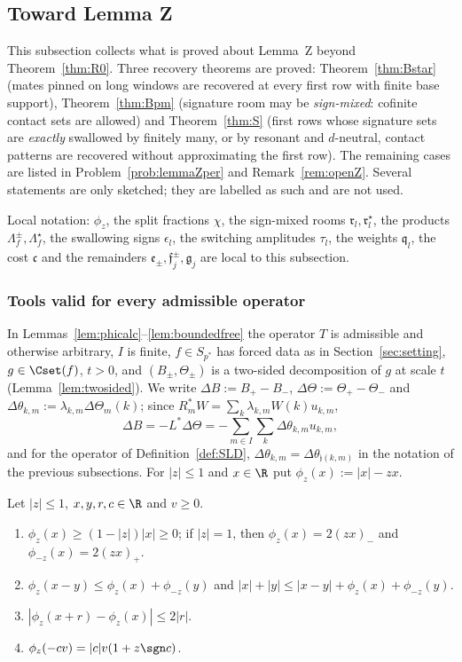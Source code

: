 
\subsection{Toward Lemma Z}\label{subsec:towardZ}
This subsection collects what is proved about Lemma~Z beyond
Theorem~\ref{thm:R0}.  Three recovery theorems are proved:
Theorem~\ref{thm:Bstar} (mates pinned on long windows are recovered at
every first row with finite base support),
Theorem~\ref{thm:Bpm} (signature room may be \emph{sign-mixed}: cofinite
contact sets are allowed) and Theorem~\ref{thm:S} (first rows whose
signature sets are \emph{exactly} swallowed by finitely many, or by
resonant and $d$-neutral, contact patterns are recovered without
approximating the first row).  The remaining cases are listed in
Problem~\ref{prob:lemmaZper} and Remark~\ref{rem:openZ}.  Several statements
are only sketched; they are labelled as such and are not used.

Local notation: $\phi_z$, the split fractions $\chi$, the sign-mixed rooms
$\mathfrak r_l,\mathfrak r^\star_l$, the products $\Lambda^\pm_f,
\Lambda^\star_f$, the swallowing signs $\epsilon_l$, the switching
amplitudes $\tau_l$, the weights $\mathfrak q_l$, the cost $\mathfrak c$
and the remainders $\mathfrak e_\pm,\mathfrak f^\pm_j,\mathfrak g_j$ are
local to this subsection.

\subsubsection*{Tools valid for every admissible operator}
In Lemmas~\ref{lem:phicalc}--\ref{lem:boundedfree} the operator $T$ is
admissible and otherwise arbitrary, $I$ is finite, $f\in S_{p^*}$ has
forced data as in Section~\ref{sec:setting}, $g\in\Cset(f)$, $t>0$, and
$(B_\pm,\Theta_\pm)$ is a two-sided decomposition of $g$ at scale $t$
(Lemma~\ref{lem:twosided}).  We write $\Delta B:=B_+-B_-$,
$\Delta\Theta:=\Theta_+-\Theta_-$ and
$\Delta\theta_{k,m}:=\lambda_{k,m}\Delta\Theta_m(k)$; since
$R_m^*W=\sum_k\lambda_{k,m}W(k)u_{k,m}$,
\begin{equation}\label{eq:DeltaB}
 \Delta B=-L^*\Delta\Theta=-\sum_{m\in I}\sum_k\Delta\theta_{k,m}u_{k,m},
\end{equation}
and for the operator of Definition~\ref{def:SLD}, $\Delta\theta_{k,m}=
\Delta\theta_{\mathfrak j(k,m)}$ in the notation of the previous subsections.
For $|z|\le1$ and $x\in\R$ put $\phi_z(x):=|x|-zx$.

\begin{lemma}\label{lem:phicalc}
Let $|z|\le1$, $x,y,r,c\in\R$ and $v\ge0$.
\begin{enumerate}
\item[(a)] $\phi_z(x)\ge(1-|z|)|x|\ge0$; if $|z|=1$, then $\phi_z(x)=2(zx)_-$
and $\phi_{-z}(x)=2(zx)_+$.
\item[(b)] $\phi_z(x-y)\le\phi_z(x)+\phi_{-z}(y)$ and
$|x|+|y|\le|x-y|+\phi_z(x)+\phi_{-z}(y)$.
\item[(c)] $|\phi_z(x+r)-\phi_z(x)|\le2|r|$.
\item[(d)] $\phi_z(-cv)=|c|v(1+z\sgn c)$.
\end{enumerate}
\end{lemma}

